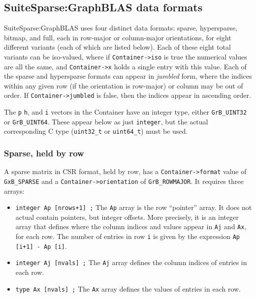 \newpage
\subsection{SuiteSparse:GraphBLAS data formats}
\label{formats}

SuiteSparse:GraphBLAS uses four distinct data formats: sparse, hypersparse,
bitmap, and full, each in row-major or column-major orientations, for eight
different variants (each of which are listed below).
Each of these eight total variants can be iso-valued, where if
\verb'Container->iso' is true the numerical values are all the same, and
\verb'Container->x' holds a single entry with this value.
Each of the sparse and hypersparse formats can appear in {\em jumbled} form,
where the indices within any given row (if the orientation is row-major)
or column may be out of order.  If \verb'Container->jumbled' is false, then
the indices appear in ascending order.

The \verb'p' \verb'h', and \verb'i' vectors in the Container have an integer
type, either \verb'GrB_UINT32' or \verb'GrB_UINT64'.  These appear below as
just \verb'integer', but the actual corresponding C type (\verb'uint32_t' or
\verb'uint64_t') must be used.

\subsubsection{Sparse, held by row}
\label{format_sparse_by_row}

A sparse matrix in CSR format, held by row, has a \verb'Container->format'
value of \verb'GxB_SPARSE' and a \verb'Container->orientation' of
\verb'GrB_ROWMAJOR'.  It requires three arrays:

\begin{itemize}
\item \verb'integer Ap [nrows+1] ;'  The \verb'Ap' array is the row
``pointer'' array.  It does not actual contain pointers, but integer offsets.
More precisely, it is an integer array that defines where the column indices
and values appear in \verb'Aj' and \verb'Ax', for each row.  The number of
entries in row \verb'i' is given by the expression \verb'Ap [i+1] - Ap [i]'.

\item \verb'integer Aj [nvals] ;'  The \verb'Aj' array defines the
column indices of entries in each row.

\item \verb'type Ax [nvals] ;'  The \verb'Ax' array defines the values of
entries in each row.  
\end{itemize}

